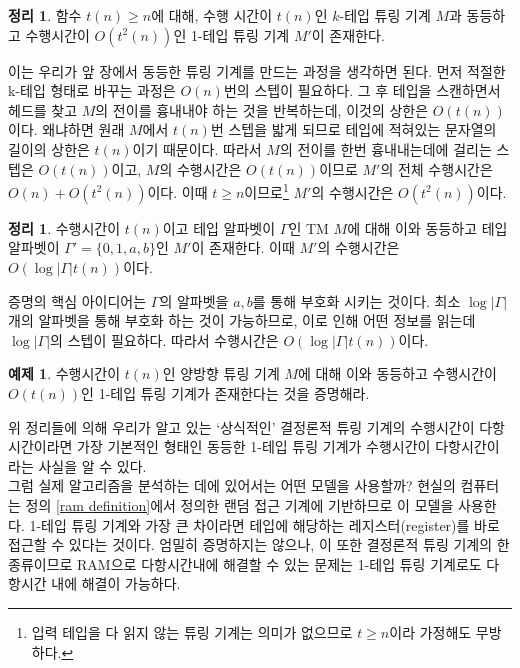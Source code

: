 \documentclass[b5paper, 11pt]{book}
\theoremstyle{definition}
\newtheorem{thm}[defn]{정리}
\newtheorem{ex}[defn]{예제}
\newenvironment{pf*}{\pushQED{\qed}\pf}
{\popQED\endpf}
\begin{document}
\begin{thm} \label{t^2(n)}
    함수 $t(n) \ge n$에 대해, 수행 시간이 $t(n)$인 $k$-테입 튜링 기계 $M$과 동등하고 수행시간이 $O\left(t^2(n)\right)$인 1-테입 튜링 기계 $M'$이 존재한다. 
\end{thm}
\begin{pf*}
    이는 우리가 앞 장에서 동등한 튜링 기계를 만드는 과정을 생각하면 된다. 먼저 적절한 k-테입 형태로 바꾸는 과정은 $O(n)$번의 스텝이 필요하다. 그 후 테입을 스캔하면서 헤드를 찾고 $M$의 전이를 흉내내야 하는 것을 반복하는데, 이것의 상한은 $O(t(n))$이다. 왜냐하면 원래 $M$에서 $t(n)$번 스텝을 밟게 되므로 테입에 적혀있는 문자열의 길이의 상한은 $t(n)$이기 때문이다. 따라서 $M$의 전이를 한번 흉내내는데에 걸리는 스텝은 $O(t(n))$이고, $M$의 수행시간은 $O(t(n))$이므로 $M'$의 전체 수행시간은 $O(n) + O(t^2(n))$이다. 이때 $t \ge n$이므로\footnote{입력 테입을 다 읽지 않는 튜링 기계는 의미가 없으므로 $t\ge n$이라 가정해도 무방하다.} $M'$의  수행시간은 $O(t^2(n))$이다.
\end{pf*}
\begin{thm}
    수행시간이 $t(n)$이고 테입 알파벳이 $\Gamma$인 TM $M$에 대해 이와 동등하고 테입 알파벳이 $\Gamma' = \{0,1,a,b\}$인 $M'$이 존재한다. 이때 $M'$의 수행시간은 $O(\log\vert\Gamma\vert t(n))$이다. 
\end{thm}
\begin{pf*}
    증명의 핵심 아이디어는 $\Gamma$의 알파벳을 $a, b$를 통해 부호화 시키는 것이다. 최소 $\log \vert\Gamma\vert$개의 알파벳을 통해 부호화 하는 것이 가능하므로, 이로 인해 어떤 정보를 읽는데  $\log\vert\Gamma\vert$의 스텝이 필요하다. 따라서 수행시간은 $O(\log\vert\Gamma\vert t(n))$이다.
\end{pf*}
\begin{ex}
    수행시간이 $t(n)$인 양방향 튜링 기계 $M$에 대해 이와 동등하고 수행시간이 $O(t(n))$인 1-테입 튜링 기계가 존재한다는 것을 증명해라.
\end{ex}
위 정리들에 의해 우리가 알고 있는 `상식적인' 결정론적 튜링 기계의 수행시간이 다항시간이라면 가장 기본적인 형태인 동등한 1-테입 튜링 기계가 수행시간이 다항시간이라는 사실을 알 수 있다.\\ 
그럼 실제 알고리즘을 분석하는 데에 있어서는 어떤 모델을 사용할까? 현실의 컴퓨터는 정의 \ref{ram definition}에서 정의한 랜덤 접근 기계에 기반하므로 이 모델을 사용한다. 1-테입 튜링 기계와 가장 큰 차이라면 테입에 해당하는 레지스터(register)를 바로 접근할 수 있다는 것이다. 엄밀히 증명하지는 않으나, 이 또한 결정론적 튜링 기계의 한 종류이므로 RAM으로 다항시간내에 해결할 수 있는 문제는 1-테입 튜링 기계로도 다항시간 내에 해결이 가능하다.
\end{document}
